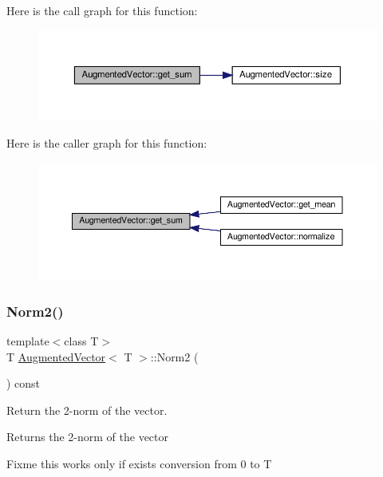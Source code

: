 Here is the call graph for this function\+:
\nopagebreak
\begin{figure}[H]
\begin{center}
\leavevmode
\includegraphics[width=350pt]{d1/d7a/classAugmentedVector_a2eb88fec648538a49922dbcd0ef277ee_cgraph}
\end{center}
\end{figure}
Here is the caller graph for this function\+:
\nopagebreak
\begin{figure}[H]
\begin{center}
\leavevmode
\includegraphics[width=350pt]{d1/d7a/classAugmentedVector_a2eb88fec648538a49922dbcd0ef277ee_icgraph}
\end{center}
\end{figure}
\mbox{\label{classAugmentedVector_ac8491c7dafbe2d1f020e1b260c759a7c}} 
\subsubsection{\texorpdfstring{Norm2()}{Norm2()}}
{\footnotesize\ttfamily template$<$class T$>$ \\
T \hyperlink{classAugmentedVector}{Augmented\+Vector}$<$ T $>$\+::Norm2 (\begin{DoxyParamCaption}{ }\end{DoxyParamCaption}) const\hspace{0.3cm}{\ttfamily [inline]}}



Return the 2-\/norm of the vector. 

\begin{DoxyReturn}{Returns}
the 2-\/norm of the vector 
\end{DoxyReturn}
Fixme this works only if exists conversion from 0 to T 

